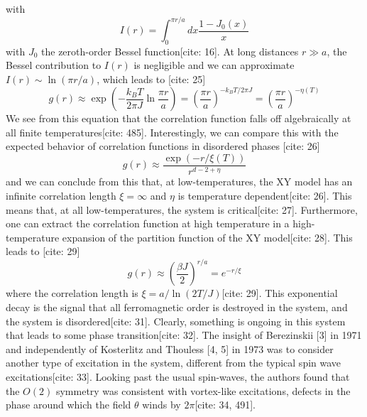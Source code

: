 \documentclass[11pt]{article}
\begin{document}
with
\begin{equation}
I(r) = \int_0^{\pi r/a} dx \frac{1 - J_0(x)}{x} \label{eq:Ir_def}
\end{equation}
with $J_0$ the zeroth-order Bessel function[cite: 16]. At long distances $r \gg a$, the Bessel contribution to $I(r)$ is negligible and we can approximate $I(r) \sim \ln(\pi r/a)$, which leads to [cite: 25]
\begin{equation}
g(r) \approx \exp\left( -\frac{k_B T}{2\pi J} \ln \frac{\pi r}{a} \right) = \left( \frac{\pi r}{a} \right)^{-k_B T / 2\pi J} = \left( \frac{\pi r}{a} \right)^{-\eta(T)} \label{eq:corr_algebraic}
\end{equation}
We see from this equation that the correlation function falls off algebraically at all finite temperatures[cite: 485]. Interestingly, we can compare this with the expected behavior of correlation functions in disordered phases [cite: 26]
\begin{equation}
g(r) \approx \frac{\exp(-r/\xi(T))}{r^{d-2+\eta}} \label{eq:corr_disordered}
\end{equation}
and we can conclude from this that, at low-temperatures, the XY model has an infinite correlation length $\xi = \infty$ and $\eta$ is temperature dependent[cite: 26]. This means that, at all low-temperatures, the system is critical[cite: 27]. Furthermore, one can extract the correlation function at high temperature in a high-temperature expansion of the partition function of the XY model[cite: 28]. This leads to [cite: 29]
\begin{equation}
g(r) \approx \left( \frac{\beta J}{2} \right)^{r/a} = e^{-r/\xi} \label{eq:corr_highT}
\end{equation}
where the correlation length is $\xi = a / \ln(2T/J)$[cite: 29]. This exponential decay is the signal that all ferromagnetic order is destroyed in the system, and the system is disordered[cite: 31]. Clearly, something is ongoing in this system that leads to some phase transition[cite: 32]. The insight of Berezinskii [3] in 1971 and independently of Kosterlitz and Thouless [4, 5] in 1973 was to consider another type of excitation in the system, different from the typical spin wave excitations[cite: 33]. Looking past the usual spin-waves, the authors found that the $O(2)$ symmetry was consistent with vortex-like excitations, defects in the phase around which the field $\theta$ winds by $2\pi$[cite: 34, 491].
\end{document}
